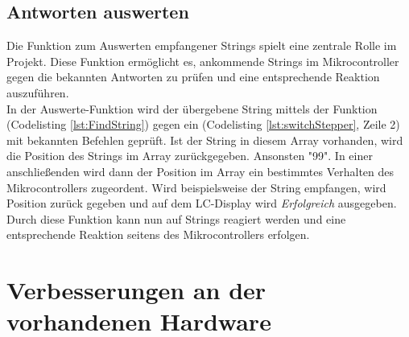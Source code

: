 \subsection{Antworten auswerten}
\label{sec:Auswerten_SM}
Die Funktion zum Auswerten empfangener Strings spielt eine zentrale Rolle im Projekt. Diese Funktion ermöglicht es, ankommende Strings im Mikrocontroller gegen die bekannten Antworten zu prüfen und eine entsprechende Reaktion auszuführen.\\
In der Auswerte-Funktion wird der übergebene String mittels der Funktion\\
(Codelisting \ref{lst:FindString}) gegen ein  (Codelisting \ref{lst:switchStepper}, Zeile 2) mit bekannten Befehlen geprüft. Ist der String in diesem Array vorhanden, wird die Position des Strings im Array zurückgegeben. Ansonsten "99". In einer anschließenden  wird dann der Position im Array ein bestimmtes Verhalten des Mikrocontrollers zugeordent. Wird beispielsweise der String \Code{\#} empfangen, wird Position  zurück gegeben und auf dem LC-Display wird \emph{Erfolgreich} ausgegeben.\\
Durch diese Funktion kann nun auf Strings reagiert werden und eine entsprechende Reaktion seitens des Mikrocontrollers erfolgen. 
\lstset{language=Java, basicstyle=\footnotesize, showstringspaces=false, tabsize=8}

\lstset{language=Java, basicstyle=\footnotesize, showstringspaces=false, tabsize=8}


\section{Verbesserungen an der vorhandenen Hardware}
\label{sec:Verbesserung_Hardware}
